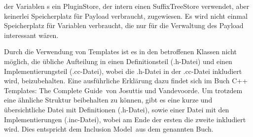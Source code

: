 \documentclass[12pt,a4paper,titlepage]{scrartcl}
\renewcommand \( {\left (}
\renewcommand \) {\right )}
\renewcommand \[ {\left [}
\renewcommand \] {\right ]}
\newcommand \Flqq {\flqq\ }
\begin{document}
der Variablen s ein PluginStore, der intern einen SuffixTreeStore verwendet, aber keinerlei Speicherplatz für Payload verbraucht, zugewiesen. Es wird nicht einmal Speicherplatz für Variablen verbraucht, die nur für die Verwaltung des Payload interessant wären.

Durch die Verwendung von Templates ist es in den betroffenen Klassen nicht möglich, die übliche Aufteilung in einen Definitionsteil (.h-Datei) und einen Implementierungsteil (.cc-Datei), wobei die .h-Datei in der .cc-Datei inkludiert wird, beizubehalten. Eine ausführliche Erklärung dazu findet sich im Buch \frqq C++ Templates: The Complete Guide\Flqq von Josuttis und Vandevoorde. Um trotzdem eine ähnliche Struktur beibehalten zu können, gibt es eine kurze und übersichtliche Datei mit Definitionen (.h-Datei), sowie einer Datei mit den Implementierungen (.inc-Datei), wobei am Ende der ersten die zweite inkludiert wird. Dies entspricht dem \frqq Inclusion Model\Flqq aus dem genannten Buch.
\end{document}
